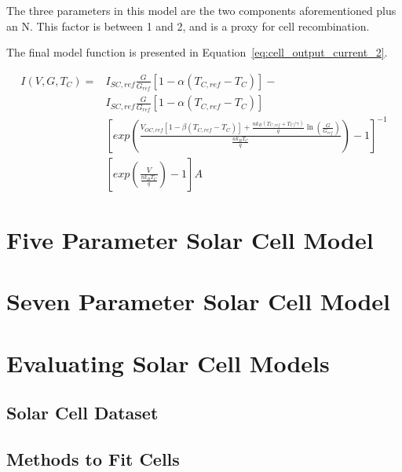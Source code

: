 The three parameters in this model are the two components aforementioned plus an
\ac{N}. This factor is between 1 and 2, and is a proxy for cell recombination.

The final model function is presented in
Equation~\ref{eq:cell_output_current_2}.

\begin{equation}
    \begin{split}
        I(V, G, T_C) = &I_{SC,ref}\frac{G}{G_{ref}}[1 - \alpha(T_{C,ref} - T_C)] - \\
        & I_{SC,ref}\frac{G}{G_{ref}}[1 - \alpha(T_{C,ref} - T_C)] \\
        & [exp(\frac{V_{OC,ref}[1 - \beta (T_{C,ref} - T_C)] + \frac{nk_B(T_{C,ref} + T_C/\gamma)}{q}\ln(\frac{G}{G_{ref}})}{\frac{nk_BT_C}{q}}) - 1]^{-1} \\
        & [exp(\frac{V}{\frac{nk_BT_C}{q}}) - 1] A
    \end{split}
    \label{eq:cell_output_current_2}
\end{equation}


\newpage
\section{Five Parameter Solar Cell Model}

\newpage
\section{Seven Parameter Solar Cell Model}


\newpage
\section{Evaluating Solar Cell Models}

\subsection*{Solar Cell Dataset}


\subsection*{Methods to Fit Cells}